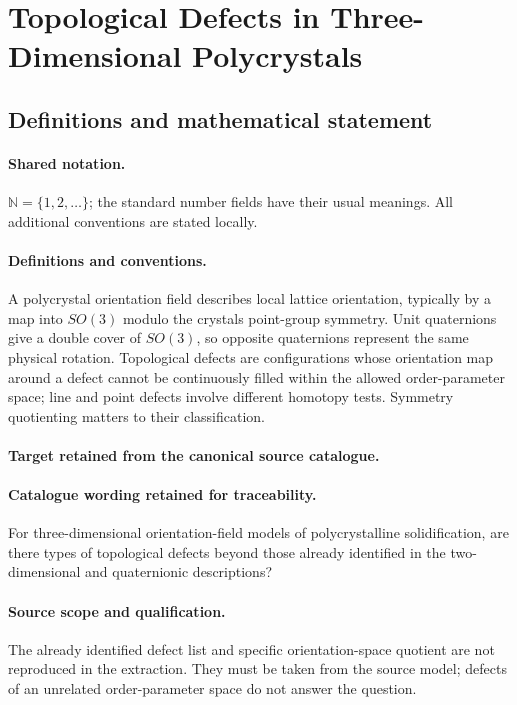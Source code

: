 \documentclass[11pt]{article}
\begin{document}
\section{Topological Defects in Three-Dimensional Polycrystals}\label{statement}

\subsection{Definitions and mathematical statement}

\paragraph{Shared notation.}$\mathbb N=\{1,2,\ldots\}$; the standard number fields have their usual meanings. All additional conventions are stated locally.


\paragraph{Definitions and conventions.}
A polycrystal orientation field describes local lattice orientation, typically by a map into $SO(3)$ modulo the crystal\textquotesingle s point-group symmetry. Unit quaternions give a double cover of $SO(3)$, so opposite quaternions represent the same physical rotation. Topological defects are configurations whose orientation map around a defect cannot be continuously filled within the allowed order-parameter space; line and point defects involve different homotopy tests. Symmetry quotienting matters to their classification.

\paragraph{Target retained from the canonical source catalogue.}
\paragraph{Catalogue wording retained for traceability.}
For three-dimensional orientation-field models of polycrystalline solidification, are there types of topological defects beyond those already identified in the two-dimensional and quaternionic descriptions?

\paragraph{Source scope and qualification.}
The already identified defect list and specific orientation-space quotient are not reproduced in the extraction. They must be taken from the source model; defects of an unrelated order-parameter space do not answer the question.
\end{document}
